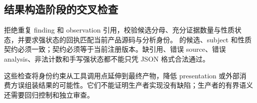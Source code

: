 \subsection{结果构造阶段的交叉检查}
 拒绝重复 finding 和 observation 引用，校验候选分母、充分证据数量与性质状态，并要求强状态的回执匹配当前产品源码与分析身份。 的候选、subject 和性质契约必须一致；契约必须等于当前注册版本。缺引用、错误 source、错误 analysis、非法计数和手写强状态都不能只凭 JSON 格式合法通过。

这些检查将身份约束从工具调用点延伸到最终产物，降低 presentation 或外部消费方误组装结果的可能性。它们不能证明生产者实现没有缺陷；生产者的有界语义还需要回归控制和独立审查。\citep{contract,productguide,acceptance}
